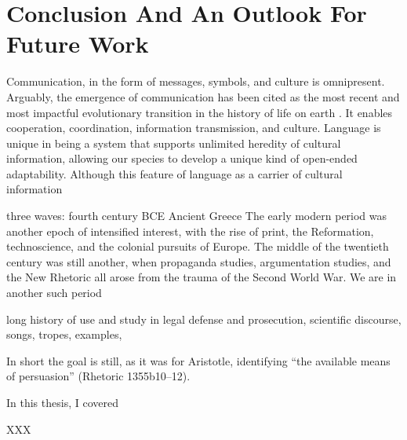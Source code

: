 \chapter{Conclusion And An Outlook For Future Work}
\label{chapter:conclusion}
Communication, in the form of messages, symbols, and culture is omnipresent. 
Arguably, the emergence of communication has been cited as the most recent and most impactful evolutionary transition in the history of life on earth \cite{smith1997major}. It enables cooperation, coordination, information transmission, and culture. Language is unique in being a system that supports unlimited heredity of cultural information, allowing our species to develop a unique kind of open-ended adaptability. Although this feature of language as a carrier of cultural information


three waves:
fourth century BCE Ancient Greece
The early modern period was another epoch of intensified interest, with the rise of print, the Reformation, technoscience, and the colonial pursuits of Europe. The middle of the twentieth century was still another, when propaganda studies, argumentation studies, and the New Rhetoric all arose from the trauma of the Second World War.
We are in another such period

long history of use and study in legal defense and prosecution, scientific discourse, songs, tropes, examples, 

In short the goal is still, as it was for Aristotle, identifying “the available means
of persuasion” (Rhetoric 1355b10–12).


In this thesis, I covered 







XXX


